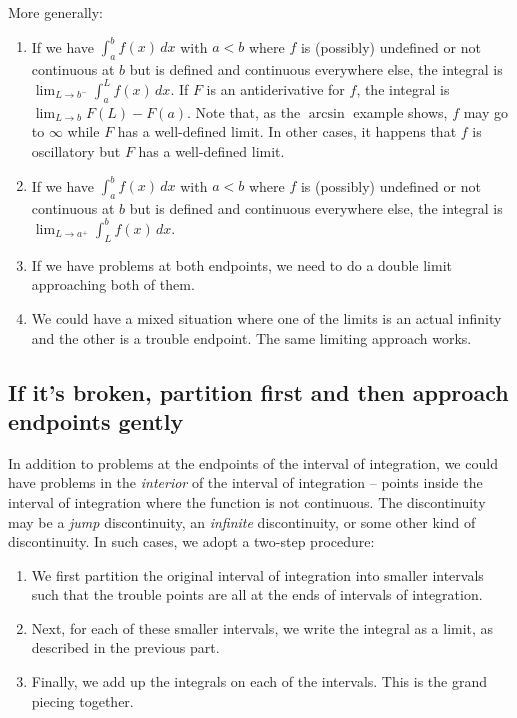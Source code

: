 \documentclass[10pt]{amsart}
\begin{document}
More generally:

\begin{enumerate}
\item If we have $\int_a^b f(x) \, dx$ with $a < b$ where $f$ is
  (possibly) undefined or not continuous at $b$ but is defined and
  continuous everywhere else, the integral is $\lim_{L \to b^-}
  \int_a^L f(x) \, dx$. If $F$ is an antiderivative for $f$, the
  integral is $\lim_{L \to b} F(L) - F(a)$. Note that, as the
  $\arcsin$ example shows, $f$ may go to $\infty$ while $F$ has a
  well-defined limit. In other cases, it happens that $f$ is
  oscillatory but $F$ has a well-defined limit.
\item If we have $\int_a^b f(x) \, dx$ with $a < b$ where $f$ is
  (possibly) undefined or not continuous at $b$ but is defined and
  continuous everywhere else, the integral is $\lim_{L \to a^+}
  \int_L^b f(x) \, dx$.
\item If we have problems at both endpoints, we need to do a double
  limit approaching both of them.
\item We could have a mixed situation where one of the limits is an
  actual infinity and the other is a trouble endpoint. The same
  limiting approach works.
\end{enumerate}

\subsection{If it's broken, partition first and then approach endpoints gently}

In addition to problems at the endpoints of the interval of
integration, we could have problems in the {\em interior} of the
interval of integration -- points inside the interval of integration
where the function is not continuous. The discontinuity may be a {\em
jump} discontinuity, an {\em infinite} discontinuity, or some other
kind of discontinuity. In such cases, we adopt a two-step procedure:

\begin{enumerate}
\item We first partition the original interval of integration into
  smaller intervals such that the trouble points are all at the ends
  of intervals of integration.
\item Next, for each of these smaller intervals, we write the integral
  as a limit, as described in the previous part.
\item Finally, we add up the integrals on each of the intervals. This
  is the grand piecing together.
\end{enumerate}
\end{document}
